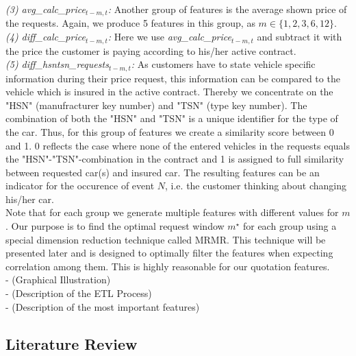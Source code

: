 \documentclass[12pt,titlepage]{article}
\begin{document}
\textit{(3) avg\_calc\_price$_{t - m, t}$:} Another group of features is the average shown price of the requests. Again, we produce 5 features in this group, as $m \in \{ 1, 2, 3, 6, 12\}$. \\
\textit{(4) diff\_calc\_price$_{t - m, t}$:} Here we use \textit{avg\_calc\_price$_{t - m, t}$} and subtract it with the price the customer is paying according to his/her active contract. \\
\textit{(5) diff\_hsntsn\_requests$_{t - m, t}$:} As customers have to state vehicle specific information during their price request, this information can be compared to the vehicle which is insured in the active contract. Thereby we concentrate on the "HSN" (manufracturer key number) and "TSN" (type key number). The combination of both the "HSN" and "TSN" is a unique identifier for the type of the car. Thus, for this group of features we create a similarity score between 0 and 1. 0 reflects the case where none of the entered vehicles in the requests equals the "HSN"-"TSN"-combination in the contract and 1 is assigned to full similarity between requested car(s) and insured car. The resulting features can be an indicator for the occurence of event $N$, i.e. the customer thinking about changing his/her car. \\
Note that for each group we generate multiple features with different values for $m$. Our purpose is to find the optimal request window $m^{\star}$ for each group using a special dimension reduction technique called MRMR. This technique will be presented later and is designed to optimally filter the features when expecting correlation among them. This is highly reasonable for our quotation features.\\

- (Graphical Illustration) \\
- (Description of the ETL Process) \\
- (Description of the most important features) \\


\subsection{Literature Review} \par
\end{document}
